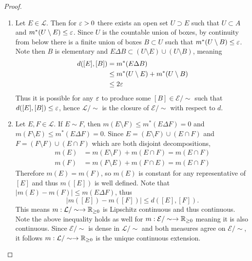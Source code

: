 \documentclass[hw_all.tex]{subfiles}
\begin{document}
\begin{proof}
\begin{enumerate}
            For completeness, let $[E_n]$ be a Cauchy sequence in $2^A / \sim$.

        \item 
            Let $E \in \mathcal{L}$. Then for $\varepsilon > 0$ there exists an open set $U \supset E$ such that $U \subset A$ and $m^*(U \setminus E) \leq \varepsilon$. Since $U$ is the countable union of boxes, by continuity from below there is a finite union of boxes $B \subset U$ such that $m^*(U \setminus B) \leq \varepsilon$. Note then $B$ is elementary and $E \Delta B \subset (U \setminus E) \cup (U \setminus B)$, meaning
            \begin{align*}
                d([E], [B]) &= m^*(E \Delta B) \\
                            &\leq m^*(U \setminus E) + m^*(U \setminus B) \\
                            &\leq 2 \varepsilon
            \end{align*}
            Thus it is possible for any $\varepsilon$ to produce some $[B] \in \mathcal{E} / \sim$ such that $d([E], [B]) \leq \varepsilon$, hence $\mathcal{L} / \sim$ is the closure of $\mathcal{E} / \sim$ with respect to $d$.

        \item 
            Let $E, F \in \mathcal{L}$. If $E \sim F$, then $m(E \setminus F) \leq m^*(E \Delta F) = 0$ and $m(F \setminus E) \leq m^*(E \Delta F) = 0$. Since $E = (E \setminus F) \cup (E \cap F)$ and $F = (F \setminus F) \cup (E \cap F)$ which are both disjoint decompositions,
            \begin{align*}
                m(E) &= m(E \setminus F) + m(E \cap F) = m(E \cap F) \\
                m(F) &= m(F \setminus E) + m(F \cap E) = m(E \cap F)
            \end{align*}
            Therefore $m(E) = m(F)$, so $m(E)$ is constant for any representative of $[E]$ and thus $m([E])$ is well defined. Note that $|m(E) - m(F)| \leq m(E \Delta F)$, thus
            \[
                |m([E]) - m([F])| \leq d([E], [F])
            .\]
            This means $m : \mathcal{L} / \sim \to \mathbb{R}_{\geq 0}$ is Lipschitz continuous and thus continuous. Note the above inequality holds as well for $m : \mathcal{E} / \sim \to \mathbb{R}_{\geq 0}$ meaning it is also continuous. Since $\mathcal{E} / \sim$ is dense in $\mathcal{L} / \sim$ and both measures agree on $\mathcal{E} / \sim$, it follows $m : \mathcal{L} / \sim \to \mathbb{R}_{\geq 0}$ is the unique continuous extension.
    \end{enumerate}
\end{proof}
\end{document}
